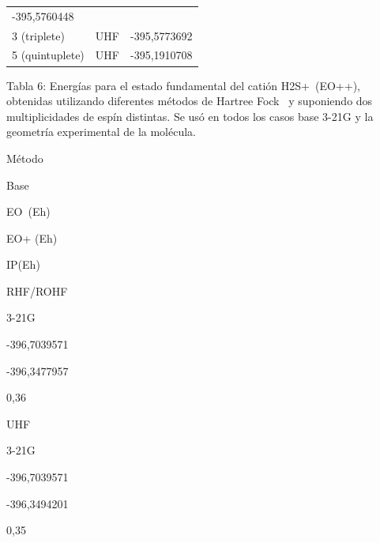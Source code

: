 \documentclass[]{article}
\begin{document}
\begin{longtable}[]{@{}lll@{}}
\begin{minipage}[t]{0.30\columnwidth}
{-395,5760448}\strut
\end{minipage}\tabularnewline
\begin{minipage}[t]{0.30\columnwidth}\raggedright\strut
{3 (triplete)}\strut
\end{minipage} & \begin{minipage}[t]{0.30\columnwidth}\raggedright\strut
{UHF}\strut
\end{minipage} & \begin{minipage}[t]{0.30\columnwidth}\raggedright\strut
{-395,5773692}\strut
\end{minipage}\tabularnewline
\begin{minipage}[t]{0.30\columnwidth}\raggedright\strut
{5 (quintuplete)}\strut
\end{minipage} & \begin{minipage}[t]{0.30\columnwidth}\raggedright\strut
{UHF}\strut
\end{minipage} & \begin{minipage}[t]{0.30\columnwidth}\raggedright\strut
{-395,1910708}\strut
\end{minipage}\tabularnewline
\bottomrule
\end{longtable}

{}

{Tabla 6}{: Energías para el estado fundamental del catión
H}{2}{S}{+}{~(E}{O}{++}{), obtenidas utilizando diferentes métodos de
Hartree Fock ~y suponiendo dos multiplicidades de espín distintas. Se
usó en todos los casos base 3-21G y la geometría experimental de la
molécula.}

{}

{}

\protect\hypertarget{t.0ed4ce1ba2e6be1944273c7a7a2da429623ab111}{}{}\protect\hypertarget{t.6}{}{}

{Método}

{Base}

{E}{O}{~(E}{h}{)}

{E}{O}{+ }{(E}{h}{)}

{IP(E}{h}{)}

{RHF/ROHF}

{3-21G}

{-396,7039571}

{-396,3477957}

{0,36}

{UHF}

{3-21G}

{-396,7039571}

{-396,3494201}

{0,35}
\end{document}
